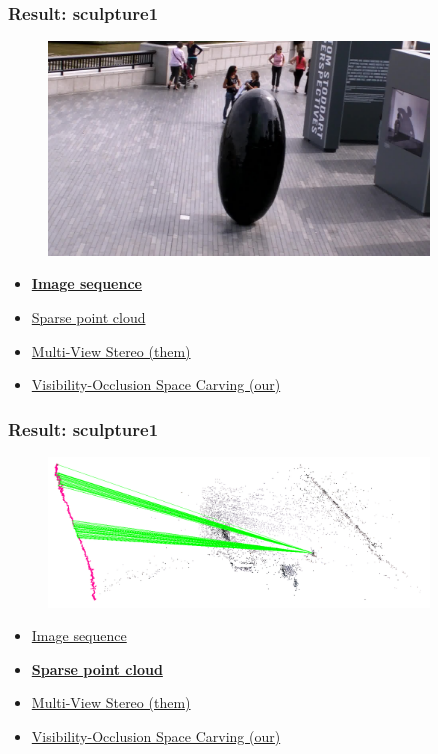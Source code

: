 \documentclass{beamer}
\begin{document}
\begin{frame}
  \frametitle{Result: sculpture1}
  \begin{figure}[htb!]
   \centering
   \includegraphics[width=0.9\textwidth]{img/sculpture1_frame}  %
  \end{figure}
  \begin{itemize}
    \item \href{run:./vid/05-result2-seq.mp4}{\textbf{Image sequence}} \\
    \item \href{run:./vid/06-result2-sparse.mp4}{Sparse point cloud} \\
    \item \href{run:./vid/07-result2-mvs.mp4}{Multi-View Stereo (them)} \\
    \item \href{run:./vid/08-result2-visocc.mp4}{Visibility-Occlusion Space Carving (our)} \\
  \end{itemize}
\end{frame}
\begin{frame}
  \frametitle{Result: sculpture1}
  \begin{figure}[htb!]
   \centering
   \includegraphics[width=0.9\textwidth]{img/sculpture1_sparse}  %
  \end{figure}
  \begin{itemize}
    \item \href{run:./vid/05-result2-seq.mp4}{Image sequence} \\
    \item \href{run:./vid/06-result2-sparse.mp4}{\textbf{Sparse point cloud}} \\
    \item \href{run:./vid/07-result2-mvs.mp4}{Multi-View Stereo (them)} \\
    \item \href{run:./vid/08-result2-visocc.mp4}{Visibility-Occlusion Space Carving (our)} \\
  \end{itemize}
\end{frame}
\end{document}
